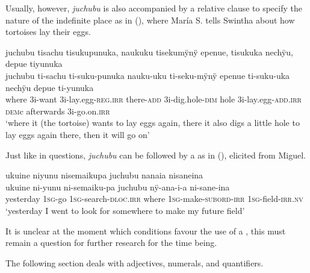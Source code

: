Usually, however, \textit{juchubu} is also accompanied by a relative clause to specify the nature of the indefinite place as in (), where María S. tells Swintha about how tortoises lay their eggs.

\ea\label{ex:RCwhere2}
\begingl
\glpreamble juchubu tisachu tisukupunuka, naukuku tisekumÿnÿ epenue, tisukuka nechÿu, depue tiyunuka\\
\gla juchubu ti-sachu ti-suku-punuka nauku-uku ti-seku-mÿnÿ epenue ti-suku-uka nechÿu depue ti-yunuka\\
\glb where 3i-want 3i-lay.egg-\textsc{reg.irr} there-\textsc{add} 3i-dig.hole-\textsc{dim} hole 3i-lay.egg-\textsc{add.irr} \textsc{dem}c afterwards 3i-go.on.\textsc{irr}\\
\glft ‘where it (the tortoise) wants to lay eggs again, there it also digs a little hole to lay eggs again there, then it will go on’
\endgl
\trailingcitation{[rxx-e121128s-1.090]}
\xe

Just like in questions, \textit{juchubu} can be followed by a  as in (), elicited from Miguel.

\ea\label{ex:go-search-field-1}
\begingl
\glpreamble ukuine niyunu nisemaikupa juchubu nanaia nisaneina\\
\gla ukuine ni-yunu ni-semaiku-pa juchubu nÿ-ana-i-a ni-sane-ina\\
\glb yesterday 1\textsc{sg}-go 1\textsc{sg}-search-\textsc{dloc.irr} where 1\textsc{sg}-make-\textsc{subord}-\textsc{irr} 1\textsc{sg}-field-\textsc{irr.nv}\\
\glft ‘yesterday I went to look for somewhere to make my future field’
\endgl
\trailingcitation{[mxx-e160811sd.152]}
\xe %

It is unclear at the moment which conditions favour the use of a , this must remain a question for further research for the time being.





The following section deals with adjectives, numerals, and quantifiers.




